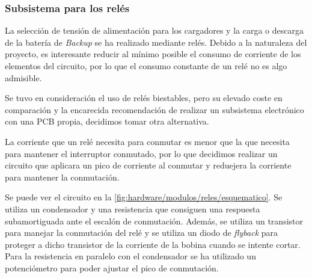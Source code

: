 \subsubsection{Subsistema para los relés}

La selección de tensión de alimentación para los cargadores y la carga o descarga de la batería de \textit{Backup} se ha realizado mediante relés. Debido a la naturaleza del proyecto, es interesante reducir al mínimo posible el consumo de corriente de los elementos del circuito, por lo que el consumo constante de un relé no es algo admisible.

Se tuvo en consideración el uso de relés biestables, pero su elevado coste en comparación y la encarecida recomendación de realizar un subsistema electrónico con una PCB propia, decidimos tomar otra alternativa. 

La corriente que un relé necesita para conmutar es menor que la que necesita para mantener el interruptor conmutado, por lo que decidimos realizar un circuito que aplicara un pico de corriente al conmutar y reduejera la corriente para mantener la conmutación. 

Se puede ver el circuito en la \autoref{fig:hardware/modulos/reles/esquematico}. Se utiliza un condensador y una resistencia que consiguen una respuesta subamortiguada ante el escalón de conmutación. Además, se utiliza un transistor para manejar la conmutación del relé y se utiliza un diodo de \textit{flyback} para proteger a dicho transistor de la corriente de la bobina cuando se intente cortar. Para la resistencia en paralelo con el condensador se ha utilizado un potenciómetro para poder ajustar el pico de conmutación. 
